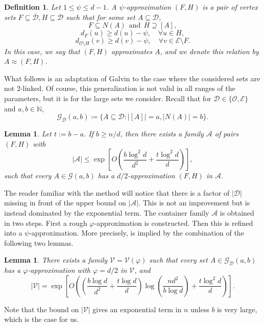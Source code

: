 \documentclass[reqno,a4paper,11pt]{amsart}
\newtheorem{definition}[theorem]{Definition}
\newtheorem{lemma}[theorem]{Lemma}
\newcommand{\cA}{\mathcal{A}}
\newcommand{\cD}{\mathcal{D}}
\newcommand{\cE}{\mathcal{E}}
\newcommand{\cG}{\mathcal{G}}
\newcommand{\cO}{\mathcal{O}}
\newcommand{\cV}{\mathcal{V}}
\begin{document}
\begin{definition}\label{def:psi_approx}
Let $1 \le \psi \le d - 1$. A \textit{$\psi$-approximation} $(F,H)$ is a pair of vertex sets $F \subseteq \overline{\cD}, H \subseteq \cD$ such that for some set $A \subseteq \cD$, 
    \begin{equation*}
        F\subseteq N(A)  \ \ \text{and} \ \ H\supseteq [A],
    \end{equation*}
    \begin{equation*}
        d_F(u)\geq d(u)-\psi, \quad \forall u\in H,
    \end{equation*}
    \begin{equation*}
        d_{\cO\setminus H}(v)\geq d(v)-\psi, \quad \forall v\in \cE\setminus F.
    \end{equation*}
    In this case, we say that $(F, H)$ approximates $A$, and we denote this relation by $A\approx (F,H)$.
\end{definition}
What follows is an adaptation of Galvin \cite{galvin2019independent} to the case where the considered sets are not $2$-linked. Of course, this generalization is not valid in all ranges of the parameters, but it is for the large sets we consider. Recall that for $\cD \in \{\cO, \cE\}$ and $a, b \in \mathbb{N}$,
\begin{equation*}
    \cG_{\cD}(a, b) \coloneqq \{A \subseteq \cD : |[A]|=a, |N(A)|=b\}.
\end{equation*}
\vspace{-0.7cm}
\begin{lemma} \label{lem:container_family}
    Let $t:=b-a$. If $b\geq n/d$, then there exists a family $\cA$ of pairs $(F,H)$ with
    \begin{equation*}
    |\cA| \le \exp\left[O\left(\frac{b\log^2d}{d^2} + \frac{t \log^2 d}{d} \right)\right],
    \end{equation*}
such that every $A\in \cG(a,b)$ has a $d/2$-approximation $(F,H)$ in $\cA$.
\end{lemma}
The reader familiar with the method will notice that there is a factor of $|\cD|$ missing in front of the upper bound on $|\cA|$. This is not an improvement but is instead dominated by the exponential term. The container family $\cA$ is obtained in two steps. First a rough $\varphi$-approximation is constructed. Then this is refined into a $\psi$-approximation. More precisely,  is implied by the combination of the following two lemmas.
\begin{lemma}\label{lem:phi_family}
    There exists a family $\cV=\cV(\varphi)$ such that every set $A\in\cG_{\cD}(a,b)$ has a $\varphi$-approximation with $\varphi=d/2$ in $\cV$, and
    \begin{equation*}
        |\cV|=\exp\left[O\left(\left(\frac{b\log d}{d^2} + \frac{t \log d}{d} \right)\log\left(\frac{nd^2}{b \log d}\right)+\frac{t\log^2 d}{d}\right)\right].
    \end{equation*}
\end{lemma}
Note that the bound on $|\cV|$ gives an exponential term in $n$ unless $b$ is very large, which is the case for us. 
\end{document}
